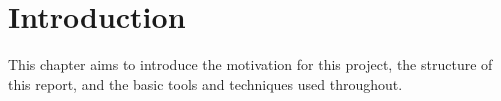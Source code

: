 \chapter{Introduction}

This chapter aims to introduce the motivation for this project, the structure of this report, and the basic tools and techniques used throughout.